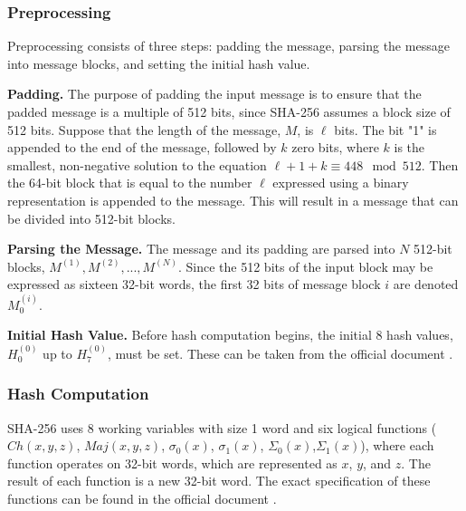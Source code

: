 \documentclass[letterpaper]{article}
\newcommand{\mypar}[1]{{\bf #1.}}
\begin{document}
\subsubsection{Preprocessing}
Preprocessing  consists  of  three  steps:  padding  the  message,  parsing  the  message into message blocks, and setting the initial hash value. 

\mypar{Padding} The  purpose of  padding  the input message is  to  ensure  that  the  padded  message  is  a  multiple  of  512 bits, since SHA-256 assumes a block size of 512 bits. Suppose  that  the  length  of  the  message, $M$,  is $\ell$ bits.  The bit "1" is appended to the end of the message, followed by $k$ zero bits, where $k$ is the smallest, non-negative solution to the equation $\ell +1+k \equiv 448 \mod 512$.  Then  the  64-bit  block  that  is  equal  to  the  number $\ell$ expressed using  a  binary  representation is appended to the message. This will result in a message that can be divided into 512-bit blocks.

\mypar{Parsing the Message} The  message  and  its  padding  are  parsed  into $N$ 512-bit blocks, $M^{(1)}, M^{(2)},..., M^{(N)}$.  Since the 512 bits of the input block may be expressed as sixteen 32-bit words, the first 32 bits of message block $i$ are denoted $M^{(i)}_0$.

\mypar{Initial Hash Value}
Before  hash  computation  begins,  the  initial 8  hash  values, $H^{(0)}_0$ up to $H^{(0)}_7$, must be set. These can be taken from the official document \cite{sha}.

\subsubsection{Hash Computation}\label{sha256-comp}
SHA-256 uses 8 working variables with size 1 word and  six  logical  functions ($Ch(x,y,z)$, $Maj(x,y,z)$, $\sigma_0(x)$, $\sigma_1(x)$, $\Sigma_0(x)$,$\Sigma_1(x)$),  where each  function  operates  on  32-bit words, which are represented as $x$, $y$, and $z$. The result of each function is a new 32-bit word. The exact specification of these functions can be found in the official document \cite{sha}. 
\end{document}
